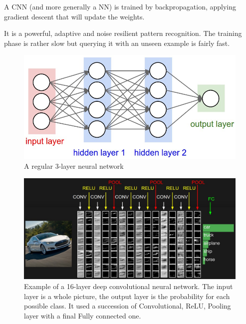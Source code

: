 A CNN (and more generally a NN) is trained by backpropagation, applying gradient descent that will update the weights.

It is a powerful, adaptive and noise resilient pattern recognition. The training phase is rather slow but querying it with an unseen example is fairly fast.

\begin{figure}[h]
    \centering
    \includegraphics[scale=0.4]{img/nn_3_layers.jpeg}
    \caption{A regular 3-layer neural network}
    \label{fig:nn_3_layer}
\end{figure}

\begin{figure}[h]
    \includegraphics[scale=0.35]{img/cnn_simple_example.jpeg}
    \caption[Example of a 16-layer deep convolutional neural network]{Example of a 16-layer deep convolutional neural network. The input layer is a whole picture, the output layer is the probability for each possible class. It used a succession of Convolutional, ReLU, Pooling layer with a final Fully connected one.}
    \label{fig:cnn_simple_example}
\end{figure}

